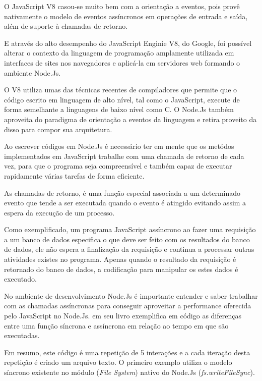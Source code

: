   O JavaScript V8 casou-se muito bem com a orientação a eventos, pois provê nativamente
  o modelo de eventos assíncronos em operações de entrada e saída, além de suporte à chamadas de retorno.\cite{Oliveira:2012}
  
  E através do alto desempenho do JavaScript Enginie V8, do Google, foi possível alterar o contexto da linguagem de programação
  amplamente utilizada em interfaces de sites nos navegadores e aplicá-la em servidores web formando o ambiente Node.Js.
  
  O V8 utiliza umas das técnicas recentes de compiladores que permite que o código escrito em linguagem de alto nível,
  tal como o JavaScript, execute de forma semelhante a linguagens de baixo nível como C. O Node.Js também aproveita
  do paradigma de orientação a eventos da linguagem e retira proveito da disso para compor sua arquitetura.

  Ao escrever códigos em Node.Js é necessário ter em mente que os metódos implementados em JavaScript trabalhe com uma 
  chamada de retorno de cada vez, para que o programa seja compreensível e também capaz de executar rapidamente várias 
  tarefas de forma eficiente.\cite{Hughes:2012}

  As chamadas de retorno, é uma função especial associada a um determinado evento que tende a ser executada quando o evento
  é atingido evitando assim a espera da execução de um processo. 
  
  Como exemplificado, um programa JavaScript assíncrono ao fazer uma requisição 
  a um banco de dados especifica o que deve ser feito com os resultados do banco de dados, ele não espera a 
  finalização da requisição e continua a processar outras atividades existes no programa. 
  Apenas quando o resultado da requisição é retornado do banco de dados, a codificação para manipular os estes dados 
  é executado. \cite[p. 2]{Junior:2012}
  
  No ambiente de desenvolvimento Node.Js é importante entender e saber trabalhar com as chamadas assíncronas para conseguir
  aproveitar a performance oferecida pelo JavaScript no Node.Js.\cite{Pereira:2013} em seu livro exemplifica em código
  as diferenças entre uma função síncrona e assíncrona em relação ao tempo em que são executadas. 
  
  Em resumo, este código é uma repetição de 5 interações e a cada iteração desta repetição é criado um arquivo texto. O primeiro
  exemplo utiliza o modelo síncrono existente no módulo (\textit{File System}) nativo do Node.Js (\textit{fs.writeFileSync}).
  
